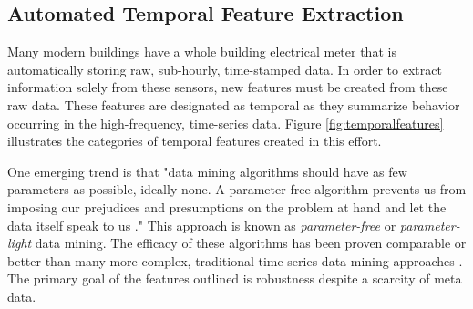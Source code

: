 \subsection{Automated Temporal Feature Extraction}
Many modern buildings have a whole building electrical meter that is automatically storing raw, sub-hourly, time-stamped data. In order to extract information solely from these sensors, new features must be created from these raw data.  These features are designated as temporal as they summarize behavior occurring in the high-frequency, time-series data. Figure \ref{fig:temporalfeatures} illustrates the categories of temporal features created in this effort.

One emerging trend is that "data mining algorithms should have as few parameters as possible, ideally none. A parameter-free algorithm prevents us from imposing our prejudices and presumptions on the problem at hand and let the data itself speak to us \cite{Keogh:2004vp}." This approach is known as \emph{parameter-free} or \emph{parameter-light} data mining. The efficacy of these algorithms has been proven comparable or better than many more complex, traditional time-series data mining approaches \cite{Keogh:2004vp}. The primary goal of the features outlined is robustness despite a scarcity of meta data.